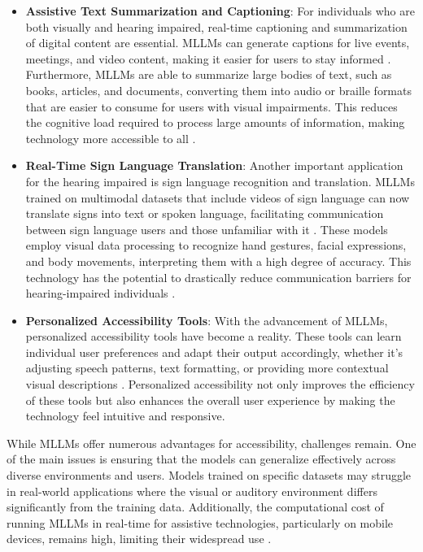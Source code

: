 \begin{itemize}
    \item \textbf{Assistive Text Summarization and Captioning}: For individuals who are both visually and hearing impaired, real-time captioning and summarization of digital content are essential. MLLMs can generate captions for live events, meetings, and video content, making it easier for users to stay informed \cite{dayma2021dall}. Furthermore, MLLMs are able to summarize large bodies of text, such as books, articles, and documents, converting them into audio or braille formats that are easier to consume for users with visual impairments. This reduces the cognitive load required to process large amounts of information, making technology more accessible to all \cite{vs2023gomez}.

    \item \textbf{Real-Time Sign Language Translation}: Another important application for the hearing impaired is sign language recognition and translation. MLLMs trained on multimodal datasets that include videos of sign language can now translate signs into text or spoken language, facilitating communication between sign language users and those unfamiliar with it \cite{vs2024wang}. These models employ visual data processing to recognize hand gestures, facial expressions, and body movements, interpreting them with a high degree of accuracy. This technology has the potential to drastically reduce communication barriers for hearing-impaired individuals \cite{huang2023language}.

    \item \textbf{Personalized Accessibility Tools}: With the advancement of MLLMs, personalized accessibility tools have become a reality. These tools can learn individual user preferences and adapt their output accordingly, whether it's adjusting speech patterns, text formatting, or providing more contextual visual descriptions \cite{vs2024song}. Personalized accessibility not only improves the efficiency of these tools but also enhances the overall user experience by making the technology feel intuitive and responsive.

\end{itemize}

While MLLMs offer numerous advantages for accessibility, challenges remain. One of the main issues is ensuring that the models can generalize effectively across diverse environments and users. Models trained on specific datasets may struggle in real-world applications where the visual or auditory environment differs significantly from the training data. Additionally, the computational cost of running MLLMs in real-time for assistive technologies, particularly on mobile devices, remains high, limiting their widespread use \cite{huang2023language}.

